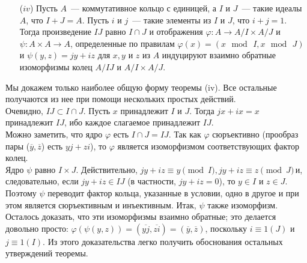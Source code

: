 \begin{thm}
\begin{itemize}
    \item[($iv$)]Пусть $A$~— коммутативное кольцо с единицей, а $I$ и $J$~— такие идеалы $A$, что $I + J = A$. Пусть $i$ и $j$~— такие элементы из $I$ и $J$, что $i + j = 1$. Тогда произведение $IJ$ равно $I \cap J$ и отображения $\varphi:A \to A/I \times A/J$ и $\psi: A \times A \to A$, определенные по правилам $\varphi(x) = (x\,\bmod\,I, x\,\bmod\,J)$ и $\psi(y, z) = jy + iz$ для $x, y$ и $z$ из $A$ индуцируют взаимно обратные изоморфизмы колец $A/IJ$ и $A/I \times A/J$.
    \end{itemize}
    \end{thm}

    \begin{myproof}
    Мы докажем только наиболее общую форму теоремы (iv). Все остальные получаются из нее при помощи нескольких простых действий.\\
    Очевидно, $IJ \subset I \cap J$. Пусть $x$ принадлежит $I$ и $J$. Тогда $jx + ix = x$ принадлежит $IJ$, ибо каждое слагаемое принадлежит $IJ$.\\
    Можно заметить, что ядро $\varphi$ есть $I \cap J = IJ$. Так как $\varphi$ сюръективно (прообраз пары ($\overline y, \overline z$) есть $yj + zi$), то $\varphi$ является изоморфизмом соответствующих фактор колец.\\
    Ядро $\psi$ равно $I \times J$. Действительно, $jy + iz \equiv y \pmod I, jy + iz \equiv z \pmod J$\,и, следовательно, если $jy+iz \in IJ$ (в частности, $jy+iz = 0$), то $y \in I$ и $z \in J$. Поэтому $\psi$ переводит фактор кольца, указанные в условии, одно в другое и при этом является сюръективным и инъективным. Итак, $\psi$ также изоморфизм. \\
    Осталось доказать, что эти изоморфизмы взаимно обратные; это делается довольно просто: $\varphi(\psi(y, z)) = (\overline{yj}, \overline{zi}) = (\overline{y}, \overline{z})$, поскольку $i \equiv 1 (J)$ и $j \equiv 1(I)$.
    Из этого доказательства легко получить обоснования остальных утверждений теоремы.
    \end{myproof}


